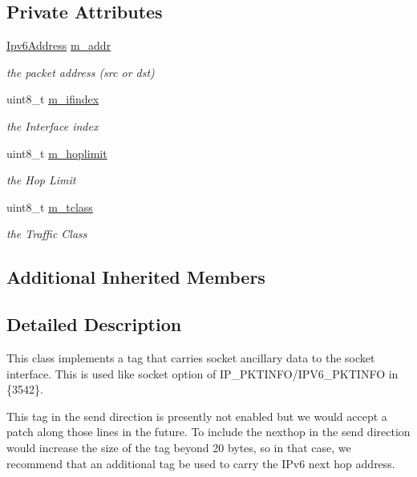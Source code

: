 \subsection*{Private Attributes}
\begin{DoxyCompactItemize}
\item 
\hyperlink{classns3_1_1Ipv6Address}{Ipv6\+Address} \hyperlink{classns3_1_1Ipv6PacketInfoTag_a483b85ae4e7fa24395b53ed02b36c646}{m\+\_\+addr}
\begin{DoxyCompactList}\small\item\em the packet address (src or dst) \end{DoxyCompactList}\item 
uint8\+\_\+t \hyperlink{classns3_1_1Ipv6PacketInfoTag_a9093a526d9b0ac774a0d1de1805a23f7}{m\+\_\+ifindex}
\begin{DoxyCompactList}\small\item\em the Interface index \end{DoxyCompactList}\item 
uint8\+\_\+t \hyperlink{classns3_1_1Ipv6PacketInfoTag_acf8109982da2ac881894047f6b14e30d}{m\+\_\+hoplimit}
\begin{DoxyCompactList}\small\item\em the Hop Limit \end{DoxyCompactList}\item 
uint8\+\_\+t \hyperlink{classns3_1_1Ipv6PacketInfoTag_a8bf3e03ce9e5c570df4a0f916caca9b9}{m\+\_\+tclass}
\begin{DoxyCompactList}\small\item\em the Traffic Class \end{DoxyCompactList}\end{DoxyCompactItemize}
\subsection*{Additional Inherited Members}


\subsection{Detailed Description}
This class implements a tag that carries socket ancillary data to the socket interface. This is used like socket option of I\+P\+\_\+\+P\+K\+T\+I\+N\+F\+O/\+I\+P\+V6\+\_\+\+P\+K\+T\+I\+N\+FO in \{3542\}. 

This tag in the send direction is presently not enabled but we would accept a patch along those lines in the future. To include the nexthop in the send direction would increase the size of the tag beyond 20 bytes, so in that case, we recommend that an additional tag be used to carry the I\+Pv6 next hop address. 

